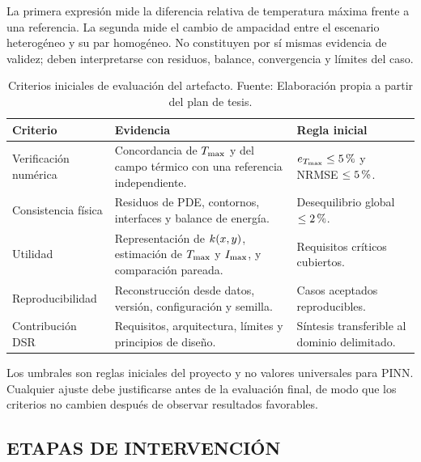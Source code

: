 La primera expresión mide la diferencia relativa de temperatura máxima frente a una referencia. La segunda mide el cambio de ampacidad entre el escenario heterogéneo y su par homogéneo. No constituyen por sí mismas evidencia de validez; deben interpretarse con residuos, balance, convergencia y límites del caso.

\begin{table}[htbp]
\centering
\caption{Criterios iniciales de evaluación del artefacto. Fuente: Elaboración propia a partir del plan de tesis.}
\label{tab:criterios-evaluacion}
\begin{tabularx}{\textwidth}{L{3.0cm}Y L{3.2cm}}
\toprule
\textbf{Criterio} & \textbf{Evidencia} & \textbf{Regla inicial} \\
\midrule
Verificación numérica & Concordancia de $T_{\max}$ y del campo térmico con una referencia independiente. & $e_{T_{\max}}\leq5\,\pct$ y NRMSE $\leq5\,\pct$. \\
Consistencia física & Residuos de PDE, contornos, interfaces y balance de energía. & Desequilibrio global $\leq2\,\pct$. \\
Utilidad & Representación de $k(x,y)$, estimación de $T_{\max}$ y $I_{\max}$, y comparación pareada. & Requisitos críticos cubiertos. \\
Reproducibilidad & Reconstrucción desde datos, versión, configuración y semilla. & Casos aceptados reproducibles. \\
Contribución DSR & Requisitos, arquitectura, límites y principios de diseño. & Síntesis transferible al dominio delimitado. \\
\bottomrule
\end{tabularx}
\end{table}

Los umbrales son reglas iniciales del proyecto y no valores universales para PINN. Cualquier ajuste debe justificarse antes de la evaluación final, de modo que los criterios no cambien después de observar resultados favorables.

\subsection{ETAPAS DE INTERVENCIÓN}

